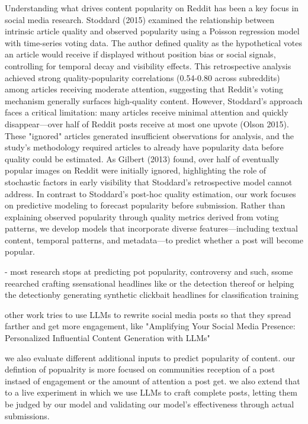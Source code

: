 
Understanding what drives content popularity on Reddit has been a key focus in social media research. Stoddard (2015) examined the relationship between intrinsic article quality and observed popularity using a Poisson regression model with time-series voting data. The author defined quality as the hypothetical votes an article would receive if displayed without position bias or social signals, controlling for temporal decay and visibility effects. This retrospective analysis achieved strong quality-popularity correlations (0.54-0.80 across subreddits) among articles receiving moderate attention, suggesting that Reddit's voting mechanism generally surfaces high-quality content.
However, Stoddard's approach faces a critical limitation: many articles receive minimal attention and quickly disappear—over half of Reddit posts receive at most one upvote (Olson 2015). These "ignored" articles generated insufficient observations for analysis, and the study's methodology required articles to already have popularity data before quality could be estimated. As Gilbert (2013) found, over half of eventually popular images on Reddit were initially ignored, highlighting the role of stochastic factors in early visibility that Stoddard's retrospective model cannot address.
In contrast to Stoddard's post-hoc quality estimation, our work focuses on predictive modeling to forecast popularity before submission. Rather than explaining observed popularity through quality metrics derived from voting patterns, we develop models that incorporate diverse features—including textual content, temporal patterns, and metadata—to predict whether a post will become popular. \cite{stoddard2015popularity}


- most research stops at predicting pot popularity, controversy and such, ssome reearched crafting ssensational headlines like \cite{xu2019clickbait} or the detection thereof \cite{potthast2016clickbait} or helping the detectionby generating synthetic clickbait headlines for classification training \cite{shu2018deep}


other work tries to use LLMs to rewrite social media posts so that they spread farther and get more engagement, like "Amplifying Your Social Media Presence: Personalized Influential Content Generation with LLMs" \cite{zhao2025amplifying}






we also evaluate different additional inputs to predict popularity of content. our defintion of popualrity is more focused on communities reception of a post instaed of engagement or the amount of attention a post get.
we also extend that to a live experiment in which we use LLMs to craft complete posts, letting them be judged by our model and validating our model's effectiveness through actual submissions.

